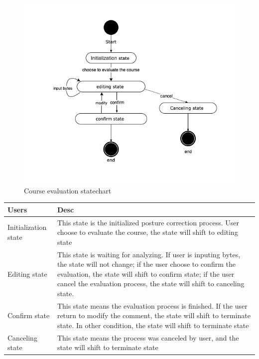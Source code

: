 \documentclass[16pt]{scrreprt}
\begin{document}
\begin{figure}[H]
	\centering
	\includegraphics[width=1.0\textwidth]{figures/stateschart2.png}
	\caption{Course evaluation statechart}
\end{figure}


\begin{center}
    \begin{tabular}{p{5cm}p{12cm}}
        \hline
	    Users & Desc\\
        \hline
	    Initialization state &  This state is the initialized posture correction process. User choose to evaluate the course, the state will shift to editing state \\
        \hline
	    Editing state & This state is waiting for analyzing. If user is inputing bytes, the state will not change; if the user choose to confirm the evaluation, the state will shift to confirm state; if the user cancel the evaluation process, the state will shift to canceling state.\\
        \hline
        Confirm state & This state means the evaluation process is finished. If the user return to modify the comment, the state will shift to terminate state. In other condition, the state will shift to terminate state\\
        \hline
        Canceling state & This state means the process was canceled by user, and the state will shift to terminate state\\
        \hline
    \end{tabular}
\end{center}
\end{document}
